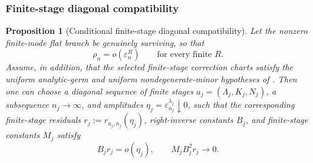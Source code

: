 \documentclass[11pt]{article}
\numberwithin{equation}{section}
\theoremstyle{plain}
\newtheorem{proposition}{Proposition}[section]
\theoremstyle{definition}
\theoremstyle{remark}
\begin{document}
\subsubsection{Finite-stage diagonal compatibility}

\begin{proposition}[Conditional finite-stage diagonal compatibility]
\label{pIV:prop:finite-stage-dnc}
Let the nonzero finite-mode flat branch be genuinely surviving, so that
\begin{equation}\label{pIV:eq:surviving-all-powers}
        \rho_n=o(\varepsilon_n^R)
        \qquad\text{for every finite }R.
\end{equation}
Assume, in addition, that the selected finite-stage correction charts satisfy the uniform analytic-germ and uniform nondegenerate-minor hypotheses of .  Then one can choose a diagonal sequence of finite stages \(a_j=(\Lambda_j,K_j,N_j)\), a subsequence \(n_j\to\infty\), and amplitudes
\(\eta_j=\varepsilon_{n_j}^{\lambda_j}\downarrow0\), such that the corresponding
finite-stage residuals \(r_j:=r_{a_j,n_j}(\eta_j)\), right-inverse constants \(B_j\),
and finite-stage constants \(M_j\) satisfy
\begin{equation}\label{pIV:eq:finite-stage-newton-smallness}
        B_jr_j=o(\eta_j),
        \qquad
        M_jB_j^2r_j\to0.
\end{equation}
\end{proposition}
\end{document}
